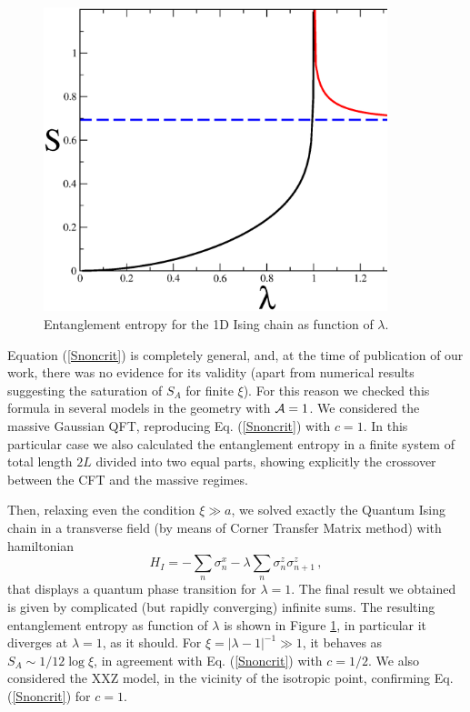 \documentclass[12pt]{article}
\def\be{\begin{equation}}
\def\ee{\end{equation}}
\begin{document}
\begin{figure}[t]
\centerline{\includegraphics[width=10cm]{fig.eps}}
\caption{Entanglement entropy for the 1D Ising chain as function of $\lambda$.
}
\label{Fig}
\end{figure}

Equation (\ref{Snoncrit}) is completely general, and, at the time of 
publication of our work, there was no evidence for its validity (apart
from numerical results\cite{Vidal} suggesting the saturation of $S_A$ for 
finite $\xi$). For this reason we checked this formula in 
several models in the geometry with ${\cal A}=1$. 
We considered the massive Gaussian QFT, reproducing Eq.
(\ref{Snoncrit}) with $c=1$. 
In this particular case we also calculated\cite{cc-04} the entanglement 
entropy in a finite system of total length $2L$ divided into two 
equal parts, showing explicitly the crossover between the CFT and the massive
regimes.

Then, relaxing even the condition $\xi\gg a$, we 
solved exactly the Quantum Ising chain in a transverse field (by means of
Corner Transfer Matrix method\cite{pkl-99}) with hamiltonian
\be
H_I=-\sum_{n}\sigma^x_n-
\lambda  \sum_{n}\sigma^z_n\sigma^z_{n+1}\,,
\label{HamI}
\ee
that displays a quantum phase transition for $\lambda=1$. 
The final result we obtained is given by complicated (but rapidly converging)
infinite sums.\cite{cc-04} 
The resulting entanglement entropy as function of $\lambda$ is shown 
in Figure \ref{Fig}, in particular it diverges at $\lambda=1$, as it should. 
For $\xi=|\lambda-1|^{-1}\gg 1$, it behaves as 
$S_A\sim 1/12 \log\xi$, in agreement with Eq. (\ref{Snoncrit}) with $c=1/2$.
We also considered the XXZ model,\cite{cc-04} in the vicinity of the 
isotropic point, confirming Eq. (\ref{Snoncrit}) for $c=1$.
\end{document}
